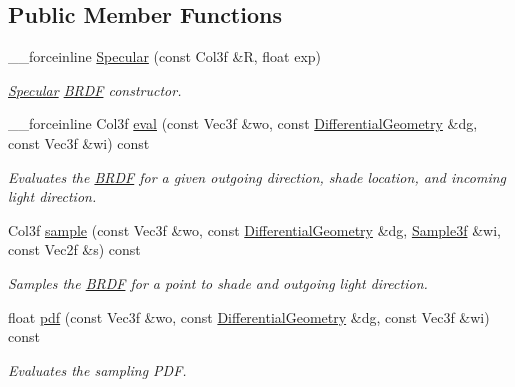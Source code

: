 \subsection*{Public Member Functions}
\begin{DoxyCompactItemize}
\item 
\_\-\_\-forceinline \hyperlink{classembree_1_1_specular_a967fa06a9ba134b46f4b7a624bffb410}{Specular} (const Col3f \&R, float exp)
\begin{DoxyCompactList}\small\item\em \hyperlink{classembree_1_1_specular}{Specular} \hyperlink{classembree_1_1_b_r_d_f}{BRDF} constructor. \item\end{DoxyCompactList}\item 
\_\-\_\-forceinline Col3f \hyperlink{classembree_1_1_specular_a557981e01db890cc5e873b8b3734fce9}{eval} (const Vec3f \&wo, const \hyperlink{structembree_1_1_differential_geometry}{DifferentialGeometry} \&dg, const Vec3f \&wi) const 
\begin{DoxyCompactList}\small\item\em Evaluates the \hyperlink{classembree_1_1_b_r_d_f}{BRDF} for a given outgoing direction, shade location, and incoming light direction. \item\end{DoxyCompactList}\item 
Col3f \hyperlink{classembree_1_1_specular_a1386f2ba135c410b176d07dd4e3c6a42}{sample} (const Vec3f \&wo, const \hyperlink{structembree_1_1_differential_geometry}{DifferentialGeometry} \&dg, \hyperlink{structembree_1_1_sample}{Sample3f} \&wi, const Vec2f \&s) const 
\begin{DoxyCompactList}\small\item\em Samples the \hyperlink{classembree_1_1_b_r_d_f}{BRDF} for a point to shade and outgoing light direction. \item\end{DoxyCompactList}\item 
float \hyperlink{classembree_1_1_specular_a0ae69bd36689b06e6800e5db06dac7ca}{pdf} (const Vec3f \&wo, const \hyperlink{structembree_1_1_differential_geometry}{DifferentialGeometry} \&dg, const Vec3f \&wi) const 
\begin{DoxyCompactList}\small\item\em Evaluates the sampling PDF. \item\end{DoxyCompactList}\end{DoxyCompactItemize}


